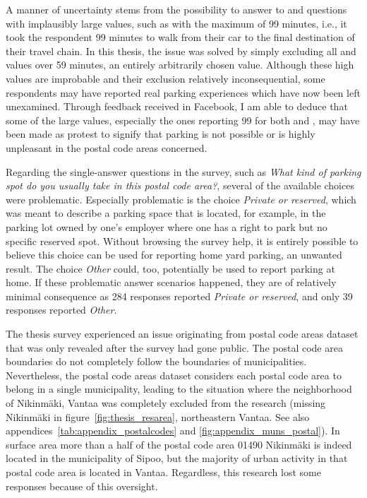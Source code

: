 A manner of uncertainty stems from the possibility to answer to  and  questions with implausibly large values, such as with the maximum of 99 minutes, i.e., it took the respondent 99 minutes to walk from their car to the final destination of their travel chain. In this thesis, the issue was solved by simply excluding all  and  values over 59 minutes, an entirely arbitrarily chosen value. Although these high values are improbable and their exclusion relatively inconsequential, some respondents may have reported real parking experiences which have now been left unexamined. Through feedback received in Facebook, I am able to deduce that some of the large values, especially the ones reporting 99 for both  and , may have been made as protest to signify that parking is not possible or is highly unpleasant in the postal code areas concerned.

Regarding the single-answer questions in the survey, such as \textit{What kind of parking spot do you usually take in this postal code area?}, several of the available choices were problematic. Especially problematic is the choice \textit{Private or reserved}, which was meant to describe a parking space that is located, for example, in the parking lot owned by one's employer where one has a right to park but no specific reserved spot. Without browsing the survey help, it is entirely possible to believe this choice can be used for reporting home yard parking, an unwanted result. The choice \textit{Other} could, too, potentially be used to report parking at home. If these problematic  answer scenarios happened, they are of relatively minimal consequence as 284 responses reported \textit{Private or reserved}, and only 39 responses reported \textit{Other}.

The thesis survey experienced an issue originating from postal code areas dataset that was only revealed after the survey had gone public. The postal code area boundaries do not completely follow the boundaries of municipalities. Nevertheless, the postal code areas dataset considers each postal code area to belong in a single municipality, leading to the situation where the neighborhood of Nikinmäki, Vantaa was completely excluded from the research (missing Nikinmäki in figure~\ref{fig:thesis_resarea}, northeastern Vantaa. See also appendices~\ref{tab:appendix_postalcodes} and \ref{fig:appendix_muns_postal}). In surface area more than a half of the postal code area 01490 Nikinmäki is indeed located in the municipality of Sipoo, but the majority of urban activity in that postal code area is located in Vantaa. Regardless, this research lost some responses because of this oversight.

